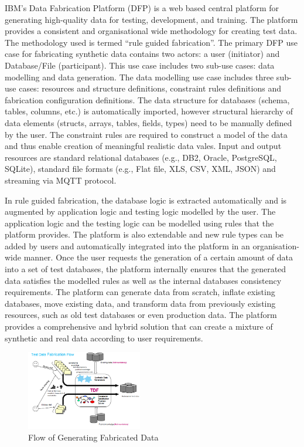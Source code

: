 

IBM’s Data Fabrication Platform (DFP) is a web based central platform for generating high-quality data for testing, development, and training. The platform provides a consistent and organisational wide methodology for creating test data. The methodology used is termed “rule guided fabrication”.
The primary DFP use case for fabricating synthetic data contains two actors: a user (initiator) and Database/File (participant). This use case includes two sub-use cases: data modelling and data generation. The data modelling use case includes three sub-use cases: resources and structure definitions, constraint rules definitions and fabrication configuration definitions. The data structure for databases (schema, tables, columns, etc.) is automatically imported, however structural hierarchy of data elements (structs, arrays, tables, fields, types) need to be manually defined by the user. The constraint rules are required to construct a model of the data and thus enable creation of meaningful realistic data vales. Input and output resources are standard relational databases (e.g., DB2, Oracle, PostgreSQL, SQLite), standard file formats (e.g., Flat file, XLS, CSV, XML, JSON) and streaming via MQTT protocol.

In rule guided fabrication, the database logic is extracted automatically and is augmented by application logic and testing logic modelled by the user.
The application logic and the testing logic can be modelled using rules that the platform provides. The platform is also extendable and new rule types can be added by users and automatically integrated into the platform in an organisation-wide manner.
Once the user requests the generation of a certain amount of data into a set of test databases, the platform internally ensures that the generated data satisfies the modelled rules as well as the internal databases consistency requirements.
The platform can generate data from scratch, inflate existing databases, move existing data, and transform data from previously existing resources, such as old test databases or even production data. The platform provides a comprehensive and hybrid solution that can create a mixture of synthetic and real data according to user requirements.

\begin{figure}
    \centering
    \includegraphics[width=0.45\textwidth]{images/DFPPlatformFlow.png}
    \caption{Flow of Generating Fabricated Data}
    \label{fig:dataFab}
\end{figure}

